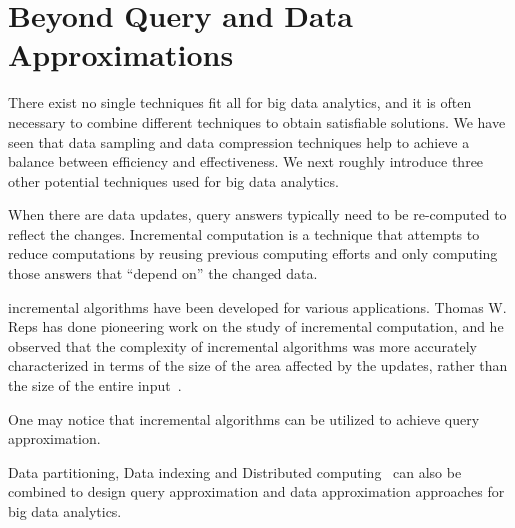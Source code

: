\section{Beyond Query and Data Approximations}
\label{sec-beyond}

There exist no single techniques fit all for big data analytics, and  it is often necessary to combine different techniques to obtain satisfiable solutions. 
We have seen that data sampling and data compression techniques help to achieve a balance between efficiency and effectiveness. 
We next roughly introduce three other potential techniques used for big data analytics. 


When there are data updates, query answers typically need to be re-computed to reflect the changes. Incremental computation is a technique that attempts to reduce computations by reusing previous computing efforts and only computing those answers that ``depend on'' the changed data.


 incremental algorithms have been developed for
various applications.  Thomas W. Reps has done pioneering work on the study of incremental computation, and he observed that
the complexity of incremental algorithms was more accurately characterized
in terms of the size of the area affected by the updates, rather than the size
of the entire input~\cite{Reps96}.

One may notice that incremental algorithms can be utilized to achieve query approximation.



Data partitioning, Data indexing and Distributed computing~\cite{MaLHLH16} can also be combined to design query approximation and data approximation approaches for big data analytics.



